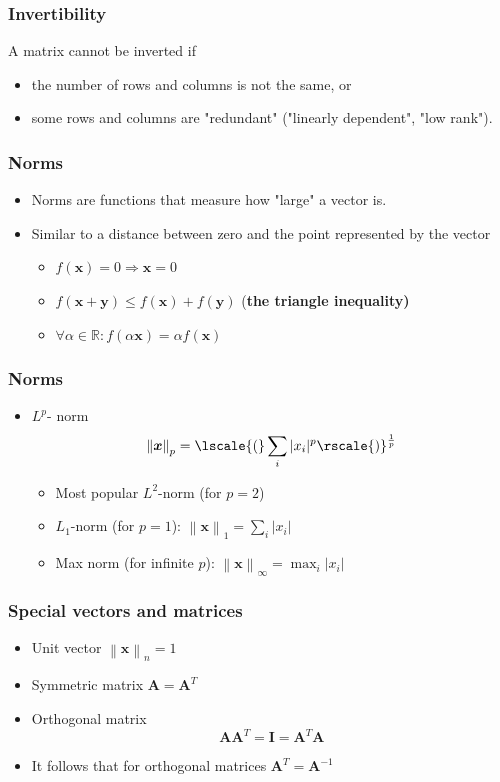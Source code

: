 \documentclass[notes]{beamer}          %
\newcommand{\vect}[1]{\bm{#1}}
\newcommand{\field}[1]{\mathbb{#1}}
\newcommand{\R}{\field{R}}
\newcommand{\norm}[1]{\left\lVert#1\right\rVert}
\newcommand{\norm}[1]{\lVert#1\rVert}
\begin{document}
\begin{frame}
\frametitle{Invertibility}
    A matrix cannot be inverted if
    \begin{itemize}
        \item the number of rows and columns is not the same, or
        \item some rows and columns are "redundant" ("linearly dependent", "low rank").
    \end{itemize}
\end{frame}

\begin{frame}
\frametitle{Norms}
    \begin{itemize}
        \item Norms are functions that measure how "large" a vector is.
        \item Similar to a distance between zero and the point represented by the vector
        \begin{itemize}
           \item $f(\vect{x}) = 0 \Rightarrow \vect{x} = 0$
           \item $f(\vect{x} + \vect{y}) \leq f(\vect{x}) + f(\vect{y})$ (\bf the triangle inequality)
           \item $\forall \alpha \in \R: f(\alpha \vect{x}) = \alpha f(\vect{x})$
        \end{itemize}
    \end{itemize}
\end{frame}

\begin{frame}
\frametitle{Norms}
    \begin{itemize}
        \item $L^p$- norm
        $$\norm{\vect{x}}_p = \lscale{(} \sum_i |x_i|^p \rscale{)}^{\frac{1}{p}}$$
        \begin{itemize}
            \item Most popular $L^2$-norm (for $p=2$)
            \item $L_1$-norm (for $p = 1$): $\norm{\vect{x}}_1 = \sum_i |x_i|$
            \item Max norm (for infinite $p$): $\norm{\vect{x}}_\infty = \max_i |x_i|$
            \end{itemize}
    \end{itemize}

\end{frame}

\begin{frame}
\frametitle{Special vectors and matrices}
    \begin{itemize}
        \item Unit vector $\norm{\vect{x}}_n = 1$
        \item Symmetric matrix $\vect{A} = \vect{A}^T$
        \item Orthogonal matrix $$\vect{A}\vect{A}^T = \vect{I} = \vect{A}^T \vect{A}$$
        \item It follows that for orthogonal matrices  $\vect{A}^T = \vect{A}^{-1}$
    \end{itemize}
\end{frame}
\end{document}
